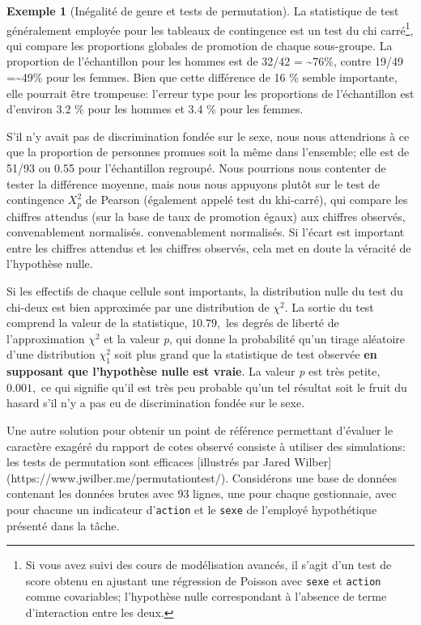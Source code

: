 \documentclass[
  11pt,
  letterpaper,
]{scrbook}
\theoremstyle{plain}
\theoremstyle{plain}
\theoremstyle{definition}
\newtheorem{example}{Exemple}[chapter]
\theoremstyle{definition}
\theoremstyle{remark}
\begin{document}
\begin{example}[Inégalité de genre et tests de
permutation]
La statistique de test généralement employée pour les tableaux de
contingence est un test du chi carré\footnote{Si vous avez suivi des
  cours de modélisation avancés, il s'agit d'un test de score obtenu en
  ajustant une régression de Poisson avec \texttt{sexe} et
  \texttt{action} comme covariables; l'hypothèse nulle correspondant à
  l'absence de terme d'interaction entre les deux.}, qui compare les
proportions globales de promotion de chaque sous-groupe. La proportion
de l'échantillon pour les hommes est de 32/42 = \textasciitilde76\%,
contre 19/49 =\textasciitilde49\% pour les femmes. Bien que cette
différence de 16 \% semble importante, elle pourrait être trompeuse:
l'erreur type pour les proportions de l'échantillon est d'environ 3.2 \%
pour les hommes et 3.4 \% pour les femmes.

S'il n'y avait pas de discrimination fondée sur le sexe, nous nous
attendrions à ce que la proportion de personnes promues soit la même
dans l'ensemble; elle est de 51/93 ou 0.55 pour l'échantillon regroupé.
Nous pourrions nous contenter de tester la différence moyenne, mais nous
nous appuyons plutôt sur le test de contingence \(X^2_p\) de Pearson
(également appelé test du khi-carré), qui compare les chiffres attendus
(sur la base de taux de promotion égaux) aux chiffres observés,
convenablement normalisés. convenablement normalisés. Si l'écart est
important entre les chiffres attendus et les chiffres observés, cela met
en doute la véracité de l'hypothèse nulle.

Si les effectifs de chaque cellule sont importants, la distribution
nulle du test du chi-deux est bien approximée par une distribution de
\(\chi^2.\) La sortie du test comprend la valeur de la statistique,
\(10.79,\) les degrés de liberté de l'approximation \(\chi^2\) et la
valeur \emph{p}, qui donne la probabilité qu'un tirage aléatoire d'une
distribution \(\chi^2_1\) soit plus grand que la statistique de test
observée \textbf{en supposant que l'hypothèse nulle est vraie}. La
valeur \emph{p} est très petite, \(0.001,\) ce qui signifie qu'il est
très peu probable qu'un tel résultat soit le fruit du hasard s'il n'y a
pas eu de discrimination fondée sur le sexe.

Une autre solution pour obtenir un point de référence permettant
d'évaluer le caractère exagéré du rapport de cotes observé consiste à
utiliser des simulations: les tests de permutation sont efficaces
{[}illustrés par Jared Wilber{]}
(https://www.jwilber.me/permutationtest/). Considérons une base de
données contenant les données brutes avec 93 lignes, une pour chaque
gestionnaie, avec pour chacune un indicateur d'\texttt{action} et le
\texttt{sexe} de l'employé hypothétique présenté dans la tâche.


\end{example}
\end{document}
